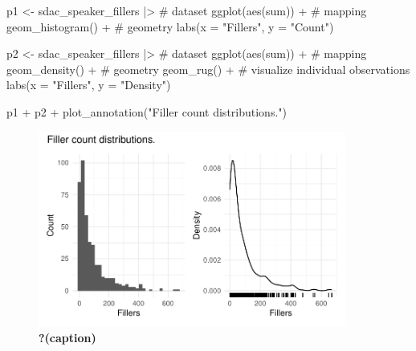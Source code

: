 \documentclass[
  letterpaper,
]{latex/krantz}
\newenvironment{Shaded}{\begin{snugshade}}{\end{snugshade}}
\newcommand{\AttributeTok}[1]{\textcolor[rgb]{0.40,0.45,0.13}{#1}}
\newcommand{\CommentTok}[1]{\textcolor[rgb]{0.37,0.37,0.37}{#1}}
\newcommand{\FunctionTok}[1]{\textcolor[rgb]{0.28,0.35,0.67}{#1}}
\newcommand{\NormalTok}[1]{\textcolor[rgb]{0.00,0.23,0.31}{#1}}
\newcommand{\OtherTok}[1]{\textcolor[rgb]{0.00,0.23,0.31}{#1}}
\newcommand{\SpecialCharTok}[1]{\textcolor[rgb]{0.37,0.37,0.37}{#1}}
\newcommand{\StringTok}[1]{\textcolor[rgb]{0.13,0.47,0.30}{#1}}
\begin{document}
\begin{Shaded}
\begin{Highlighting}[]
\NormalTok{p1 }\OtherTok{\textless{}{-}} 
\NormalTok{  sdac\_speaker\_fillers }\SpecialCharTok{|\textgreater{}} \CommentTok{\# dataset}
  \FunctionTok{ggplot}\NormalTok{(}\FunctionTok{aes}\NormalTok{(sum)) }\SpecialCharTok{+} \CommentTok{\# mapping}
  \FunctionTok{geom\_histogram}\NormalTok{() }\SpecialCharTok{+}  \CommentTok{\# geometry}
  \FunctionTok{labs}\NormalTok{(}\AttributeTok{x =} \StringTok{"Fillers"}\NormalTok{, }\AttributeTok{y =} \StringTok{"Count"}\NormalTok{)}

\NormalTok{p2 }\OtherTok{\textless{}{-}} 
\NormalTok{  sdac\_speaker\_fillers }\SpecialCharTok{|\textgreater{}} \CommentTok{\# dataset}
  \FunctionTok{ggplot}\NormalTok{(}\FunctionTok{aes}\NormalTok{(sum)) }\SpecialCharTok{+} \CommentTok{\# mapping}
  \FunctionTok{geom\_density}\NormalTok{() }\SpecialCharTok{+} \CommentTok{\# geometry}
  \FunctionTok{geom\_rug}\NormalTok{() }\SpecialCharTok{+}  \CommentTok{\# visualize individual observations}
  \FunctionTok{labs}\NormalTok{(}\AttributeTok{x =} \StringTok{"Fillers"}\NormalTok{, }\AttributeTok{y =} \StringTok{"Density"}\NormalTok{)}

\NormalTok{p1 }\SpecialCharTok{+}\NormalTok{ p2 }\SpecialCharTok{+} \FunctionTok{plot\_annotation}\NormalTok{(}\StringTok{"Filler count distributions."}\NormalTok{)}
\end{Highlighting}
\end{Shaded}

\begin{figure}[H]

{\centering \includegraphics[width=0.9\textwidth,height=\textheight]{./inference_files/figure-pdf/fig-i-uni-cont-sdac-visual-1.pdf}

}

\caption{\label{fig-i-uni-cont-sdac-visual}\textbf{?(caption)}}

\end{figure}
\end{document}
